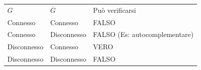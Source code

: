 \documentclass{article}
\begin{document}
\begin{longtable}[]{@{}lll@{}}
\toprule
\begin{minipage}[t]{0.30\columnwidth}\raggedright\strut
$G$\strut
\end{minipage} & \begin{minipage}[t]{0.30\columnwidth}\raggedright\strut
$\overline{G}$\strut
\end{minipage} & \begin{minipage}[t]{0.30\columnwidth}\raggedright\strut
{Può verificarsi}\strut
\end{minipage}\tabularnewline
\begin{minipage}[t]{0.30\columnwidth}\raggedright\strut
{Connesso}\strut
\end{minipage} & \begin{minipage}[t]{0.30\columnwidth}\raggedright\strut
{Connesso}\strut
\end{minipage} & \begin{minipage}[t]{0.30\columnwidth}\raggedright\strut
{FALSO}\strut
\end{minipage}\tabularnewline
\begin{minipage}[t]{0.30\columnwidth}\raggedright\strut
{Connesso}\strut
\end{minipage} & \begin{minipage}[t]{0.30\columnwidth}\raggedright\strut
{Disconnesso}\strut
\end{minipage} & \begin{minipage}[t]{0.30\columnwidth}\raggedright\strut
{FALSO (Es: autocomplementare)}\strut
\end{minipage}\tabularnewline
\begin{minipage}[t]{0.30\columnwidth}\raggedright\strut
{Disconnesso}\strut
\end{minipage} & \begin{minipage}[t]{0.30\columnwidth}\raggedright\strut
{Connesso}\strut
\end{minipage} & \begin{minipage}[t]{0.30\columnwidth}\raggedright\strut
{VERO}\strut
\end{minipage}\tabularnewline
\begin{minipage}[t]{0.30\columnwidth}\raggedright\strut
{Disconnesso}\strut
\end{minipage} & \begin{minipage}[t]{0.30\columnwidth}\raggedright\strut
{Disconnesso}\strut
\end{minipage} & \begin{minipage}[t]{0.30\columnwidth}\raggedright\strut
{FALSO}\strut
\end{minipage}\tabularnewline
\bottomrule
\end{longtable}
\end{document}
